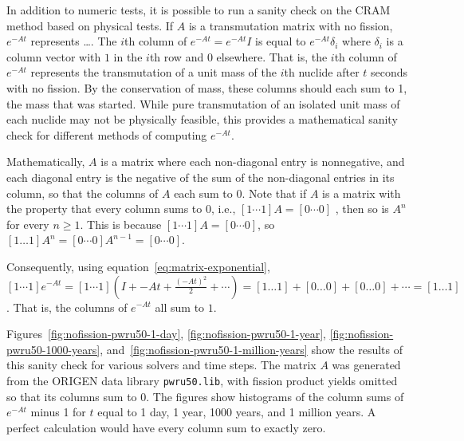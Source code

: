 In addition to numeric tests, it is possible to run a sanity check on the CRAM
method based on physical tests. If $A$ is a transmutation matrix with no
fission, $e^{-At}$ represents {\color{red}\ldots}. The $i$th column of
$e^{-At}=e^{-At}I$ is equal to $e^{-At}\delta_{i}$ where $\delta_i$ is a
column vector with $1$ in the $i$th row and $0$ elsewhere. That is, the $i$th
column of $e^{-At}$ represents the transmutation of a unit mass of the $i$th
nuclide after $t$ seconds with no fission. By the conservation of mass, these
columns should each sum to 1, the mass that was started. While pure
transmutation of an isolated unit mass of each nuclide may not be physically
feasible, this provides a mathematical sanity check for different methods of
computing $e^{-At}$.

Mathematically, $A$ is a matrix where each non-diagonal entry is nonnegative,
and each diagonal entry is the negative of the sum of the non-diagonal entries
in its column, so that the columns of $A$ each sum to $0$. Note that if $A$ is
a matrix with the property that every column sums to $0$, i.e.,
$[1 \cdots 1] A = [0 \cdots 0]$ ,
then so is $A^n$ for every $n\geq 1$. This is because
$[1 \cdots 1] A = [0 \cdots 0]$, so
$[1 \ldots 1] A^n = [0 \cdots 0] A^{n-1} = [0\cdots 0]$.

Consequently, using equation~\ref{eq:matrix-exponential},
$[1 \cdots 1]e^{-At} = [1 \cdots 1] (I + -At + \frac{(-At)^2}{2} + \cdots) = [1\ldots
1] + [0 \ldots 0] + [0 \ldots 0] + \cdots = [1\ldots 1]$. That is,
the columns of $e^{-At}$ all sum to $1$.

Figures~\ref{fig:nofission-pwru50-1-day}, \ref{fig:nofission-pwru50-1-year},
\ref{fig:nofission-pwru50-1000-years},
and~\ref{fig:nofission-pwru50-1-million-years} show the results of this sanity
check for various solvers and time steps. The matrix $A$ was generated from
the ORIGEN data library \texttt{pwru50.lib}, with fission product yields
omitted so that its columns sum to $0$. The figures show histograms of the
column sums of $e^{-At}$ minus 1 for $t$ equal to 1 day, 1 year, 1000 years,
and 1 million years. A perfect calculation would have every column sum to
exactly zero.

